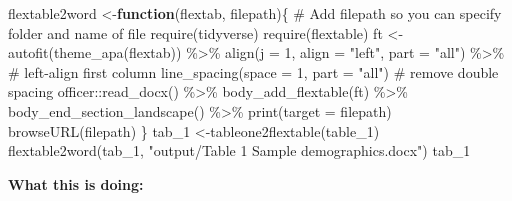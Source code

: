 \documentclass[
  letterpaper,
  DIV=11,
  numbers=noendperiod]{scrreprt}
\newenvironment{Shaded}{\begin{snugshade}}{\end{snugshade}}
\newcommand{\CommentTok}[1]{\textcolor[rgb]{0.37,0.37,0.37}{#1}}
\newcommand{\ControlFlowTok}[1]{\textcolor[rgb]{0.00,0.23,0.31}{\textbf{#1}}}
\newcommand{\NormalTok}[1]{\textcolor[rgb]{0.00,0.23,0.31}{#1}}
\newcommand{\OtherTok}[1]{\textcolor[rgb]{0.00,0.23,0.31}{#1}}
\begin{document}
\begin{Shaded}
\begin{Highlighting}[]
\NormalTok{flextable2word }\OtherTok{\textless{}{-}}\ControlFlowTok{function}\NormalTok{(flextab, filepath)\{            }\CommentTok{\# Add filepath so you can specify folder and name of file   require(tidyverse)   require(flextable)   ft \textless{}{-}autofit(theme\_apa(flextab)) \%\textgreater{}\%     align(j = 1, align = "left", part = "all") \%\textgreater{}\%        \# left{-}align first column     line\_spacing(space = 1, part = "all")                  \# remove double spacing   officer::read\_docx() \%\textgreater{}\%     body\_add\_flextable(ft) \%\textgreater{}\%     body\_end\_section\_landscape() \%\textgreater{}\%     print(target = filepath)   browseURL(filepath) \}  tab\_1 \textless{}{-}tableone2flextable(table\_1)    flextable2word(tab\_1, "output/Table 1 Sample demographics.docx")  tab\_1}
\end{Highlighting}
\end{Shaded}

\textbf{What this is doing:}
\end{document}
